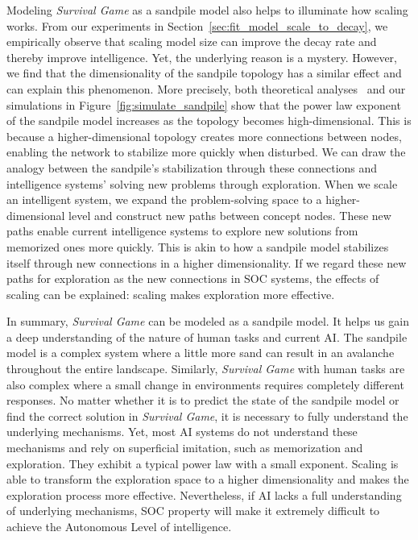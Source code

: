 


Modeling \textit{Survival Game} as a sandpile model also helps to illuminate how scaling works. From our experiments in Section~\ref{sec:fit_model_scale_to_decay}, we empirically observe that scaling model size can improve the decay rate and thereby improve intelligence. Yet, the underlying reason is a mystery.
However, we find that the dimensionality of the sandpile topology has a similar effect and can explain this phenomenon. 
More precisely, both theoretical analyses~\citep{dhar2006theoretical, zachariou2015generalised} and our simulations in Figure~\ref{fig:simulate_sandpile} show that the power law exponent of the sandpile model increases as the topology becomes high-dimensional. This is because a higher-dimensional topology creates more connections between nodes, enabling the network to stabilize more quickly when disturbed. We can draw the analogy between the sandpile's stabilization through these connections and intelligence systems' solving new problems through exploration. When we scale an intelligent system, we expand the problem-solving space to a higher-dimensional level and construct new paths between concept nodes. These new paths enable current intelligence systems to explore new solutions from memorized ones more quickly. This is akin to how a sandpile model stabilizes itself through new connections in a higher dimensionality. If we regard these new paths for exploration as the new connections in SOC systems, the effects of scaling can be explained: scaling makes exploration more effective. 


In summary, \textit{Survival Game} can be modeled as a sandpile model. It helps us gain a deep understanding of the nature of human tasks and current AI. The sandpile model is a complex system where a little more sand can result in an avalanche throughout the entire landscape. Similarly, \textit{Survival Game} with human tasks are also complex where a small change in environments requires completely different responses. 
No matter whether it is to predict the state of the sandpile model or find the correct solution in \textit{Survival Game}, it is necessary to fully understand the underlying mechanisms. 
Yet, most AI systems do not understand these mechanisms and rely on superficial imitation, such as memorization and exploration. 
They exhibit a typical power law with a small exponent. 
Scaling is able to transform the exploration space to a higher dimensionality and makes the exploration process more effective. 
Nevertheless, if AI lacks a full understanding of underlying mechanisms, SOC property will make it extremely difficult to achieve the Autonomous Level of intelligence.






